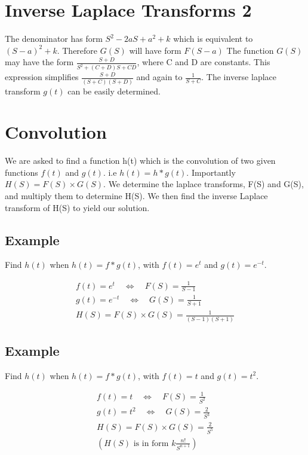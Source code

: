 \documentclass[12pt, a4paper]{article}
\begin{document}
\section{Inverse Laplace Transforms 2}

The denominator has form $S^2 - 2aS + a^2 + k$ which is equivalent
to $(S-a)^2 + k$. Therefore $G(S)$ will have form $F(S-a)$
\newline
The function $G(S)$ may have the form $\frac{S+D}{S^2 +(C+D)S +
CD}$, where C and D are constants. This expression simplifies
$\frac{S+D}{(S+C)(S+D)}$ and again to $\frac{1}{S+C}$. The inverse
laplace transform $g(t)$ can be easily determined.
\section{Convolution}
We are asked to find a function h(t) which is the convolution of
two given functions $f(t)$ and $g(t)$. i.e $h(t)=h*g(t)$.\newline
Importantly $H(S) = F(S)\times G(S)$. We determine the laplace
transforms, F(S) and G(S), and multiply them to determine H(S). We
then find the inverse Laplace transform of H(S) to yield our
solution.
\subsection{Example}
Find $h(t)$ when $h(t) = f*g(t)$, with $f(t)= e^{t}$ and $g(t)=
e^{-t}$.\newline

\begin{eqnarray}
f(t) = e^{t} \quad \Leftrightarrow \quad F(S)= \frac{1}{S-1}
 \nonumber\\
g(t) = e^{-t} \quad \Leftrightarrow \quad G(S)= \frac{1}{S+1}
 \nonumber\\
H(S) = F(S)\times G(S) = \frac{1}{(S-1)(S+1)}
 \nonumber
\end{eqnarray}
\subsection{Example}
Find $h(t)$ when $h(t) = f*g(t)$, with $f(t)= t$ and $g(t)=
t^2$.\newline

\begin{eqnarray}
f(t) = t \quad \Leftrightarrow \quad F(S)= \frac{1}{S^2}
 \nonumber\\
g(t) = t^2 \quad \Leftrightarrow \quad G(S)= \frac{2}{S^3}
 \nonumber\\
H(S) = F(S)\times G(S) = \frac{2}{S^5}
 \nonumber\\
(H(S) \mbox{ is in form }  k\frac{n!}{S^{n+1}} )
 \nonumber
\end{eqnarray}
\end{document}
